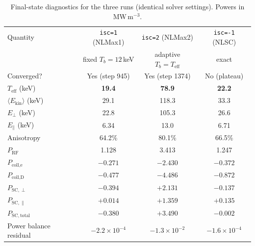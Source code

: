 \documentclass[11pt,a4paper]{article}
\begin{document}
\begin{table}[h]
\centering
\caption{Final-state diagnostics for the three runs (identical solver
  settings). Powers in MW\,m$^{-3}$.}
\label{tab:results}
\begin{tabular}{lccc}
\toprule
Quantity & \texttt{isc=1} (NLMax1) & \texttt{isc=2} (NLMax2) & \texttt{isc=-1} (NLSC) \\
         & fixed $T_b=12$\,keV     & adaptive $T_b=T_\text{eff}$ & exact \\
\midrule
Converged?                  & Yes (step 945)  & Yes (step 1374) & No (plateau)\footnotemark \\
$T_\text{eff}$ (keV)        & \textbf{19.4}   & \textbf{78.9}   & \textbf{22.2} \\
$\langle E_\text{kin}\rangle$ (keV) & 29.1    & 118.3           & 33.3 \\
$E_\perp$ (keV)             & 22.8            & 105.3           & 26.6 \\
$E_\parallel$ (keV)         & 6.34            & 13.0            & 6.71 \\
Anisotropy                  & 64.2\%          & 80.1\%          & 66.5\% \\
\midrule
$P_\text{RF}$               & 1.128           & 3.413           & 1.247 \\
$P_\text{coll,e}$           & $-0.271$        & $-2.430$        & $-0.372$ \\
$P_\text{coll,D}$           & $-0.477$        & $-4.486$        & $-0.872$ \\
$P_{\mathrm{SC},\perp}$     & $-0.394$        & $+2.131$        & $-0.137$ \\
$P_{\mathrm{SC},\parallel}$ & $+0.014$        & $+1.359$        & $+0.135$ \\
$P_{\mathrm{SC,total}}$     & $\mathbf{-0.380}$ & $\mathbf{+3.490}$ & $\mathbf{-0.002}$ \\
Power balance residual      & $-2.2\times10^{-4}$ & $-1.3\times10^{-2}$ & $-1.6\times10^{-4}$ \\
\bottomrule
\end{tabular}
\end{table}
\end{document}
